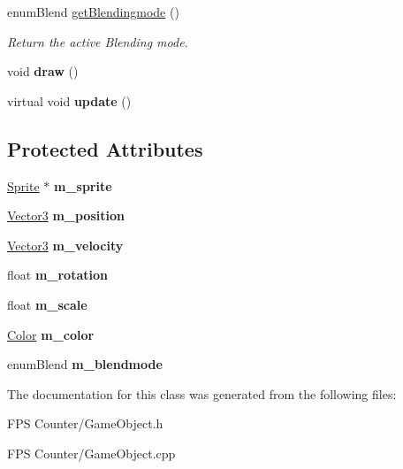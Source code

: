 \begin{DoxyCompactItemize}
\mbox{\label{class_game_object_a53e80c55ef5db02d9d70e0487af7464c}} 
enum\+Blend \mbox{\hyperlink{class_game_object_a53e80c55ef5db02d9d70e0487af7464c}{get\+Blendingmode}} ()
\begin{DoxyCompactList}\small\item\em Return the active Blending mode. \end{DoxyCompactList}\item 
\mbox{\label{class_game_object_abb64143e72358beb808db22182517802}} 
void {\bfseries draw} ()
\item 
\mbox{\label{class_game_object_adad7d284b670db722a2fda8e6a7997e3}} 
virtual void {\bfseries update} ()
\end{DoxyCompactItemize}
\subsection*{Protected Attributes}
\begin{DoxyCompactItemize}
\item 
\mbox{\label{class_game_object_ac117fc8efcc2ccb52e6536c87df8fad1}} 
\mbox{\hyperlink{class_sprite}{Sprite}} $\ast$ {\bfseries m\+\_\+sprite}
\item 
\mbox{\label{class_game_object_acd172f669e9fbea80a388448fb450af5}} 
\mbox{\hyperlink{class_vector3}{Vector3}} {\bfseries m\+\_\+position}
\item 
\mbox{\label{class_game_object_a86fcd612b3f44c90454fa50e875f73f1}} 
\mbox{\hyperlink{class_vector3}{Vector3}} {\bfseries m\+\_\+velocity}
\item 
\mbox{\label{class_game_object_a69c4523411c24fd3a4e2b86e748e6742}} 
float {\bfseries m\+\_\+rotation}
\item 
\mbox{\label{class_game_object_aeacf313d6a432fd7ec7c4197f85a2dc1}} 
float {\bfseries m\+\_\+scale}
\item 
\mbox{\label{class_game_object_a1771d24fddc27ba4f1940aaaf8a103eb}} 
\mbox{\hyperlink{class_color}{Color}} {\bfseries m\+\_\+color}
\item 
\mbox{\label{class_game_object_aa2167915430a65181290a0b13168bbe1}} 
enum\+Blend {\bfseries m\+\_\+blendmode}
\end{DoxyCompactItemize}


The documentation for this class was generated from the following files\+:\begin{DoxyCompactItemize}
\item 
F\+P\+S Counter/Game\+Object.\+h\item 
F\+P\+S Counter/Game\+Object.\+cpp\end{DoxyCompactItemize}
